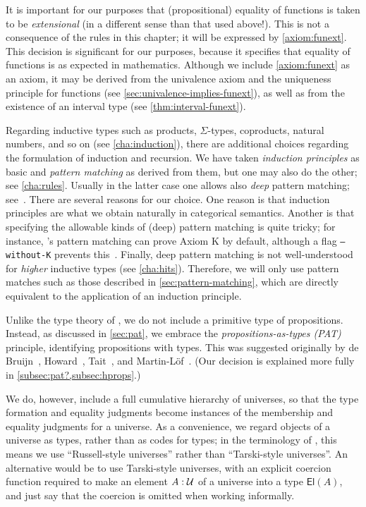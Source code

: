 It is important for our purposes that (propositional) equality of functions is taken to be \emph{extensional} (in a different sense than that used above!).
This is not a consequence of the rules in this chapter; it will be expressed by \cref{axiom:funext}.
%
This decision is significant for our purposes, because it specifies that equality of functions is as expected in mathematics.  Although we include \cref{axiom:funext} as an axiom, it may be derived from the univalence axiom and the uniqueness principle for functions (see \cref{sec:univalence-implies-funext}), as well as from the existence of an interval type (see \cref{thm:interval-funext}).

Regarding inductive types such as products, $\Sigma$-types, coproducts, natural numbers, and so on (see \cref{cha:induction}), there are additional choices regarding the formulation of induction and recursion.
%
We have taken \emph{induction principles} as basic and \emph{pattern matching} as derived from them, but one may also do the other; see \cref{cha:rules}.
Usually in the latter case one allows also \emph{deep} pattern matching; see~\cite{Coquand92Pattern}.
There are several reasons for our choice.
One reason is that induction principles are what we obtain naturally in categorical semantics.
Another is that specifying the allowable kinds of (deep) pattern matching is quite tricky;
for instance, \Agda's
%
pattern matching can prove Axiom K by default,
%
although a flag \texttt{--without-K} prevents this~\cite{CDP14}.
Finally, deep pattern matching is not well-understood for \emph{higher} inductive types (see \cref{cha:hits}).
Therefore, we will only use pattern matches such as those described in \cref{sec:pattern-matching}, which are directly equivalent to the application of an induction principle.

%
Unlike the type theory of \Coq, we do not include a primitive type of propositions.  Instead, as discussed in \cref{sec:pat}, we embrace 
the \emph{propositions-as-types (PAT)} principle, identifying propositions with types.
This was suggested originally by de Bruijn~\cite{deBruijn-1973}, Howard~\cite{howard:pat}, Tait~\cite{Tait-1968}, and Martin-L\"{o}f~\cite{Martin-Lof-1972}.
(Our decision is explained more fully in \cref{subsec:pat?,subsec:hprops}.)

We do, however, include a full cumulative hierarchy of universes, so that the type formation and equality judgments become instances of the membership and equality judgments for a universe.
As a convenience, we regard objects of a universe as types, rather than as codes for types; in the terminology of \cite{martin-lof:bibliopolis}, this means we use ``Russell-style universes'' rather than ``Tarski-style universes''.
%
%
An alternative would be to use Tarski-style universes, with an explicit coercion function required to make an element $A:\mathcal{U}$ of a universe into a type $\mathsf{El}(A)$, and just say that the coercion is omitted when working informally.

